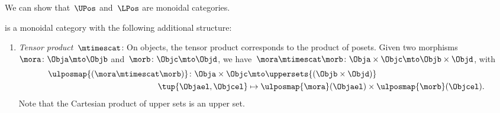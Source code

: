 We can show that~$\UPos$ and~$\LPos$ are monoidal categories.


\begin{lemma}
\label{lem:upos_moncat}
\UPos is a monoidal category with the following additional structure:
\begin{enumerate}
    \item \emph{Tensor product~$\mtimescat$}: On objects, the tensor product corresponds to the product of posets.
    Given two morphisms~$\mora\colon \Obja\mto \Objb$ and~$\morb\colon \Objc\mto \Objd$, we have~$\mora \mtimescat \morb\colon  \Obja \times \Objc \mto \Objb\times \Objd$, with
    \begin{equation}
    \begin{aligned}
       \ulposmap{(\mora\mtimescat \morb)}\colon \Obja \times \Objc &\mto \uppersets{(\Objb\times \Objd)}\\
        \tup{\Objael,\Objcel}&\mapsto \ulposmap{\mora}(\Objael)\times \ulposmap{\morb}(\Objcel).
    \end{aligned}
    \end{equation}
    Note that the Cartesian product of upper sets is an upper set.


\end{enumerate}
\end{lemma}
